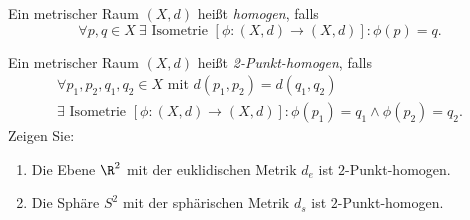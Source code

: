 \begin{assignment}
  Ein metrischer Raum \( (X,d) \) heißt \emph{homogen}, falls
  \begin{equation*}
    \forall  p,q \in X \ \exists \text{ Isometrie } [\phi: (X,d) \to (X,d)] : \phi(p) = q\text{.}
  \end{equation*}
  
  Ein metrischer Raum \( (X,d) \) heißt \emph{2-Punkt-homogen}, falls
  \begin{multline*}
    \forall p_1,p_2,q_1,q_2 \in X \text{ mit } d(p_1,p_2) = d(q_1,q_2) \\
    \exists \text{ Isometrie } [\phi: (X,d) \to (X,d)] : \phi(p_1) = q_1 \wedge \phi(p_2) = q_2\text{.}
  \end{multline*}
  Zeigen Sie:
  \begin{enumerate}[label=(\alph*)]
    \item Die Ebene \( \R^2 \) mit der euklidischen Metrik \( d_e \) ist \( 2 \)-Punkt-homogen.
    \item Die Sphäre \( S^2 \) mit der sphärischen Metrik \( d_s \) ist \( 2 \)-Punkt-homogen.
  \end{enumerate}
\end{assignment}
